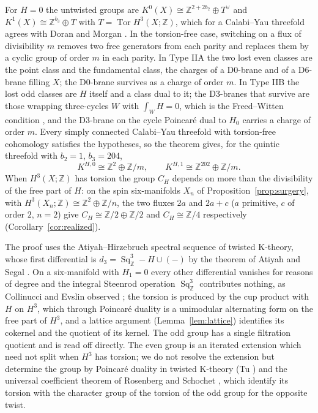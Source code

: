 \documentclass[reqno,11pt]{amsart}
\theoremstyle{definition}
\newcommand{\ZZ}{\mathbb{Z}}
\newcommand{\Sq}{\operatorname{Sq}}
\DeclareMathOperator{\Tor}{Tor}
\begin{document}
For $H=0$ the untwisted groups are $K^0(X)\cong\ZZ^{2+2b_2}\oplus T^\vee$ and $K^1(X)\cong\ZZ^{b_3}\oplus T$ with $T=\Tor H^3(X;\ZZ)$, which for a Calabi--Yau threefold agrees with Doran and Morgan \cite{DM07}. In the torsion-free case, switching on a flux of divisibility $m$ removes two free generators from each parity and replaces them by a cyclic group of order $m$ in each parity. In Type IIA the two lost even classes are the point class and the fundamental class, the charges of a D0-brane and of a D6-brane filling $X$; the D0-brane survives as a charge of order $m$. In Type IIB the lost odd classes are $H$ itself and a class dual to it; the D3-branes that survive are those wrapping three-cycles $W$ with $\int_W H=0$, which is the Freed--Witten condition \cite{FW99}, and the D3-brane on the cycle Poincar\'e dual to $H_0$ carries a charge of order $m$. Every simply connected Calabi--Yau threefold with torsion-free cohomology satisfies the hypotheses, so the theorem gives, for the quintic threefold with $b_2=1$, $b_3=204$,
\[
K^{H,0}\cong\ZZ^2\oplus\ZZ/m,\qquad K^{H,1}\cong\ZZ^{202}\oplus\ZZ/m .
\]
When $H^3(X;\ZZ)$ has torsion the group $C_H$ depends on more than the divisibility of the free part of $H$: on the spin six-manifolds $X_n$ of Proposition~\ref{prop:surgery}, with $H^3(X_n;\ZZ)\cong\ZZ^2\oplus\ZZ/n$, the two fluxes $2a$ and $2a+c$ ($a$ primitive, $c$ of order $2$, $n=2$) give $C_H\cong\ZZ/2\oplus\ZZ/2$ and $C_H\cong\ZZ/4$ respectively (Corollary~\ref{cor:realized}).

The proof uses the Atiyah--Hirzebruch spectral sequence of twisted K-theory, whose first differential is $d_3=\Sq^3_\ZZ-H\cup(-)$ by the theorem of Atiyah and Segal \cite{AS06}. On a six-manifold with $H_1=0$ every other differential vanishes for reasons of degree and the integral Steenrod operation $\Sq^3_\ZZ$ contributes nothing, as Collinucci and Evslin observed \cite{CE07}; the torsion is produced by the cup product with $H$ on $H^3$, which through Poincar\'e duality is a unimodular alternating form on the free part of $H^3$, and a lattice argument (Lemma~\ref{lem:lattice}) identifies its cokernel and the quotient of its kernel. The odd group has a single filtration quotient and is read off directly. The even group is an iterated extension which need not split when $H^3$ has torsion; we do not resolve the extension but determine the group by Poincar\'e duality in twisted K-theory (Tu \cite{Tu09}) and the universal coefficient theorem of Rosenberg and Schochet \cite{RS87}, which identify its torsion with the character group of the torsion of the odd group for the opposite twist.
\end{document}
